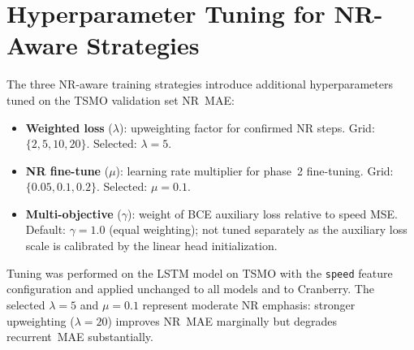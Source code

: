 \documentclass[a4paper]{cas-sc}
\begin{document}
\section{Hyperparameter Tuning for NR-Aware Strategies}
\label{app:hyperparams}

The three NR-aware training strategies introduce additional
hyperparameters tuned on the TSMO validation set NR~MAE:

\begin{itemize}
  \item \textbf{Weighted loss} ($\lambda$):
        upweighting factor for confirmed NR steps.
        Grid: $\{2, 5, 10, 20\}$.
        Selected: $\lambda = 5$.
  \item \textbf{NR fine-tune} ($\mu$):
        learning rate multiplier for phase~2 fine-tuning.
        Grid: $\{0.05, 0.1, 0.2\}$.
        Selected: $\mu = 0.1$.
  \item \textbf{Multi-objective} ($\gamma$):
        weight of BCE auxiliary loss relative to speed MSE.
        Default: $\gamma = 1.0$ (equal weighting);
        not tuned separately as the auxiliary loss scale is
        calibrated by the linear head initialization.
\end{itemize}

Tuning was performed on the LSTM model on TSMO with the
\texttt{speed} feature configuration and applied unchanged to
all models and to Cranberry.
The selected $\lambda = 5$ and $\mu = 0.1$ represent moderate
NR emphasis: stronger upweighting ($\lambda = 20$) improves
NR~MAE marginally but degrades recurrent~MAE substantially.




\end{document}
